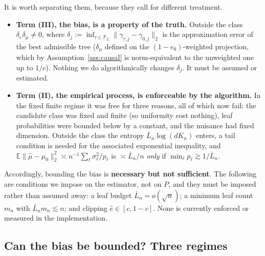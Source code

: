 \documentclass[11pt]{article}
\theoremstyle{plain}
\theoremstyle{definition}
\theoremstyle{remark}
\newcommand{\E}{\mathbb{E}}
\newcommand{\cT}{\mathcal{T}}
\newcommand{\ez}{e_0}
\newcommand{\mz}{\mu_0}
\newcommand{\ehat}{\widehat{e}}
\newcommand{\mhat}{\widehat{\mu}}
\newcommand{\Ltwo}[1]{\lVert #1 \rVert_{2}}
\begin{document}
It is worth separating them, because they call for different treatment.

\begin{itemize}[leftmargin=*]
  \item \textbf{Term (III), the bias, is a property of the truth.} Outside the
  class $\delta_e\delta_\mu\neq0$, where
  $\delta_j := \inf_{\tau\in\cT_{\bar L}}\Ltwo{\gamma_{\tau,j}-\gamma_{0,j}}$ is
  the approximation error of the best admissible tree ($\delta_\mu$ defined on the
  $(1-\ez)$-weighted projection, which by Assumption~\ref{ass:causal} is
  norm-equivalent to the unweighted one up to $1/c$). Nothing we do
  algorithmically changes $\delta_j$. It must be assumed or estimated.
  \item \textbf{Term (II), the empirical process, is enforceable by the
  algorithm.} In the fixed finite regime it was free for three reasons, all of
  which now fail: the candidate class was fixed and finite (so uniformity cost
  nothing), leaf probabilities were bounded below by a constant, and the nuisance
  had fixed dimension. Outside the class the entropy $\bar L_n\log(dK_n)$ enters,
  a tail condition is needed for the associated exponential inequality, and
  $\E\Ltwo{\mhat-\mz}^2 \asymp n^{-1}\sum_\ell \sigma^2_\ell/p_\ell$ is
  $\asymp \bar L_n/n$ \emph{only} if $\min_\ell p_\ell\gtrsim 1/\bar L_n$.
\end{itemize}

Accordingly, bounding the bias is \textbf{necessary but not sufficient}. The
following are conditions we impose on the estimator, not on $P$, and they must be
imposed rather than assumed away: a leaf budget $\bar L_n = o(\sqrt n)$; a minimum
leaf count $m_n$ with $\bar L_n m_n\lesssim n$; and clipping
$\ehat\in[c,1-c]$. None is currently enforced or measured in the implementation.

\subsection{Can the bias be bounded? Three regimes}
\end{document}
